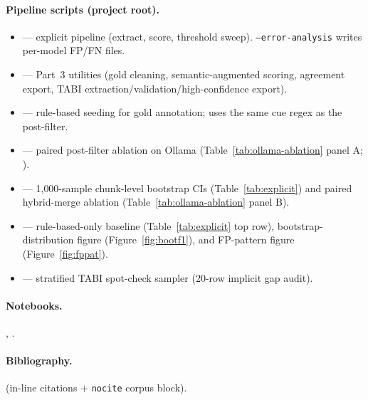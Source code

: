 \documentclass{article}
\begin{document}
\paragraph{Pipeline scripts (project root).}
\begin{itemize}
  \item {} --- explicit pipeline (extract, score, threshold sweep). \texttt{--error-analysis} writes per-model FP/FN files.
  \item {} --- Part~3 utilities (gold cleaning, semantic-augmented scoring, agreement export, TABI extraction/validation/high-confidence export).
  \item {} --- rule-based seeding for gold annotation; uses the same cue regex as the post-filter.
  \item {} --- paired post-filter ablation on Ollama (Table~\ref{tab:ollama-ablation} panel A; ).
  \item {} --- 1{,}000-sample chunk-level bootstrap CIs (Table~\ref{tab:explicit}) and paired hybrid-merge ablation (Table~\ref{tab:ollama-ablation} panel B).
  \item {} --- rule-based-only baseline (Table~\ref{tab:explicit} top row), bootstrap-distribution figure (Figure~\ref{fig:bootf1}), and FP-pattern figure (Figure~\ref{fig:fppat}).
  \item {} --- stratified TABI spot-check sampler (20-row implicit gap audit).
\end{itemize}

\paragraph{Notebooks.} , .

\paragraph{Bibliography.}  (in-line citations $+$ \texttt{nocite} corpus block).
\end{document}
